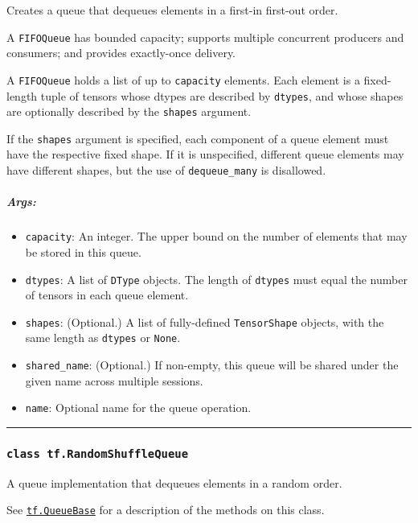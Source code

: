Creates a queue that dequeues elements in a first-in first-out order.

A \texttt{FIFOQueue} has bounded capacity; supports multiple concurrent
producers and consumers; and provides exactly-once delivery.

A \texttt{FIFOQueue} holds a list of up to \texttt{capacity} elements.
Each element is a fixed-length tuple of tensors whose dtypes are
described by \texttt{dtypes}, and whose shapes are optionally described
by the \texttt{shapes} argument.

If the \texttt{shapes} argument is specified, each component of a queue
element must have the respective fixed shape. If it is unspecified,
different queue elements may have different shapes, but the use of
\texttt{dequeue\_many} is disallowed.

\subparagraph{Args: }\label{args-54}

\begin{itemize}
\tightlist
\item
  \texttt{capacity}: An integer. The upper bound on the number of
  elements that may be stored in this queue.
\item
  \texttt{dtypes}: A list of \texttt{DType} objects. The length of
  \texttt{dtypes} must equal the number of tensors in each queue
  element.
\item
  \texttt{shapes}: (Optional.) A list of fully-defined
  \texttt{TensorShape} objects, with the same length as \texttt{dtypes}
  or \texttt{None}.
\item
  \texttt{shared\_name}: (Optional.) If non-empty, this queue will be
  shared under the given name across multiple sessions.
\item
  \texttt{name}: Optional name for the queue operation.
\end{itemize}

\begin{center}\rule{0.5\linewidth}{\linethickness}\end{center}

\subsubsection{\texorpdfstring{\texttt{class\ tf.RandomShuffleQueue}
}{class tf.RandomShuffleQueue }}\label{class-tf.randomshufflequeue}

A queue implementation that dequeues elements in a random order.

See \protect\hyperlink{QueueBase}{\texttt{tf.QueueBase}} for a
description of the methods on this class.

